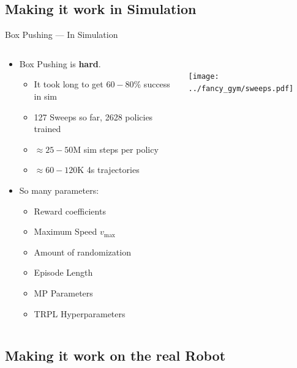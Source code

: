 \documentclass[16:9,en,navbarinfooter]{sdqbeamer}
\begin{document}
\subsection{Making it work in Simulation}
\begin{frame}{Box Pushing --- In Simulation}

\begin{columns}[t]
    \begin{column}{0.4\textwidth}
        \vspace{1cm}
        \begin{itemize}
            \item Box Pushing is \textbf{hard}.
            \begin{itemize}
                \item It took long to get $60-80$\% success in sim 
                \item 127 Sweeps so far, 2628 policies trained
                \item $\approx 25-50\text{M}$ sim steps per policy 
                \item $\approx 60-120\text{K}$ 4s trajectories
            \end{itemize}
            \item So many parameters:
            \begin{itemize}
                \item Reward coefficients
                \item Maximum Speed $v_{\max}$
                \item Amount of randomization
                \item Episode Length
                \item MP Parameters
                \item TRPL Hyperparameters
            \end{itemize}
        \end{itemize}
    \end{column}
    \begin{column}{0.5\textwidth}
        \vspace{.2cm} \\
        \center 
        \texttt{[image: ../fancy\_gym/sweeps.pdf]} \\

    \end{column}
\end{columns}
\end{frame}

\subsection{Making it work on the real Robot}
\end{document}
